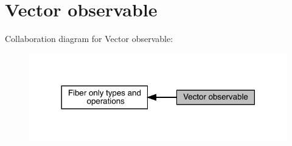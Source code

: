 \hypertarget{group__obsvector}{}\section{Vector observable}
\label{group__obsvector}
Collaboration diagram for Vector observable\+:\nopagebreak
\begin{figure}[H]
\begin{center}
\leavevmode
\includegraphics[width=318pt]{da/d59/group__obsvector}
\end{center}
\end{figure}
